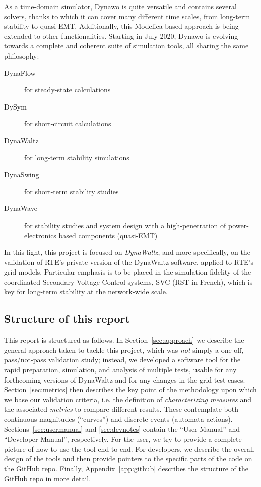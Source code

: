 \documentclass[11pt, a4paper, twoside, titlepage]{article}
\begin{document}
As a time-domain simulator, Dynawo is quite versatile and contains
several solvers, thanks to which it can cover many different time
scales, from long-term stability to quasi-EMT. Additionally, this
Modelica-based approach is being extended to other
functionalities. Starting in July 2020, Dynawo is evolving towards a
complete and coherent suite of simulation tools, all sharing the same
philosophy:
\begin{description}
\item[DynaFlow] for steady-state calculations
\item[DySym] for short-circuit calculations
\item[DynaWaltz] for long-term stability simulations
\item[DynaSwing] for short-term stability studies
\item[DynaWave] for stability studies and system design with a
  high-penetration of power-electronics based components (quasi-EMT)
\end{description}
In this light, this project is focused on \emph{DynaWaltz}, and more
specifically, on the validation of RTE's private version of the
DynaWaltz software, applied to RTE's grid models. Particular emphasis
is to be placed in the simulation fidelity of the coordinated
Secondary Voltage Control systems, SVC (RST in French), which is key
for long-term stability at the network-wide scale.


\subsection{Structure of this report}
This report is structured as follows. In Section~\ref{sec:approach} we
describe the general approach taken to tackle this project, which was
\emph{not} simply a one-off, pass/not-pass validation study; instead,
we developed a software tool for the rapid preparation, simulation,
and analysis of multiple tests, usable for any forthcoming versions of
DynaWaltz and for any changes in the grid test cases.
Section~\ref{sec:metrics} then describes the key point of the
methodology upon which we base our validation criteria, i.e. the
definition of \emph{characterizing measures} and the associated
\emph{metrics} to compare different results. These contemplate both
continuous magnitudes (``curves'') and discrete events (automata
actions).  Sections~\ref{sec:usermanual} and \ref{sec:devnotes}
contain the ``User Manual'' and ``Developer Manual'',
respectively. For the user, we try to provide a complete picture of
how to use the tool end-to-end. For developers, we describe the
overall design of the tools and then provide pointers to the specific
parts of the code on the GitHub repo. Finally,
Appendix~\ref{app:github} describes the structure of the GitHub repo
in more detail.
\end{document}
